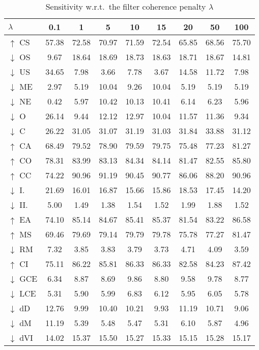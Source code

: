\documentclass[journal]{IEEEtran}
\begin{document}
\begin{table*}
    \caption{Sensitivity w.r.t.\ the filter coherence penalty $\lambda$}
	\centering
	\begin{tabular}{@{} l *{8}{S[table-format=2.3,detect-inline-weight=math,table-align-text-post=false]} @{}}
		\toprule
		{$\lambda$}      & {0.1} & {1} & {5} & {10} & {15} & {20} & {50} & {100} \\
		\midrule
		$\uparrow$ CS    & 57.38 & 72.58 & 70.97 & 71.59 & 72.54 & 65.85 & 68.56 & 75.70 \\
		$\downarrow$ OS  & 9.67 & 18.64 & 18.69 & 18.73 & 18.63 & 18.71 & 18.67 & 14.81 \\
		$\downarrow$ US  & 34.65 & 7.98 & 3.66 & 7.78 & 3.67 & 14.58 & 11.72 & 7.98 \\
		$\downarrow$ ME  & 2.97 & 5.19 & 10.04 & 9.26 & 10.04 & 5.19 & 5.19 & 5.19 \\
		$\downarrow$ NE  & 0.42 & 5.97 & 10.42 & 10.13 & 10.41 & 6.14 & 6.23 & 5.96 \\
		$\downarrow$ O   & 26.14 & 9.44 & 12.12 & 12.97 & 10.04 & 11.57 & 11.36 & 9.34 \\
		$\downarrow$ C   & 26.22 & 31.05 & 31.07 & 31.19 & 31.03 & 31.84 & 33.88 & 31.12 \\
		$\uparrow$ CA    & 68.49 & 79.52 & 78.90 & 79.59 & 79.75 & 75.48 & 77.23 & 81.27 \\
		$\uparrow$ CO    & 78.31 & 83.99 & 83.13 & 84.34 & 84.14 & 81.47 & 82.55 & 85.80 \\
		$\uparrow$ CC    & 74.22 & 90.96 & 91.19 & 90.45 & 90.77 & 86.06 & 88.20 & 90.96 \\
		$\downarrow$ I.  & 21.69 & 16.01 & 16.87 & 15.66 & 15.86 & 18.53 & 17.45 & 14.20 \\
		$\downarrow$ II. & 5.00 & 1.49 & 1.38 & 1.54 & 1.52 & 1.99 & 1.88 & 1.52 \\
		$\uparrow$ EA    & 74.10 & 85.14 & 84.67 & 85.41 & 85.37 & 81.54 & 83.22 & 86.58 \\
		$\uparrow$ MS    & 69.46 & 79.69 & 79.14 & 79.79 & 79.78 & 75.78 & 77.27 & 81.47 \\
		$\downarrow$ RM  & 7.32 & 3.85 & 3.83 & 3.79 & 3.73 & 4.71 & 4.09 & 3.59 \\
		$\uparrow$ CI    & 75.11 & 86.22 & 85.81 & 86.33 & 86.33 & 82.58 & 84.23 & 87.42 \\
		$\downarrow$ GCE & 6.34 & 8.87 & 8.69 & 9.86 & 8.80 & 9.58 & 9.78 & 8.77 \\
		$\downarrow$ LCE & 5.31 & 5.90 & 5.99 & 6.83 & 6.12 & 5.95 & 6.05 & 5.78 \\
		$\downarrow$ dD  & 12.76 & 9.99 & 10.40 & 10.21 & 9.93 & 11.19 & 10.71 & 9.06 \\
		$\downarrow$ dM  & 11.19 & 5.39 & 5.48 & 5.47 & 5.31 & 6.10 & 5.87 & 4.96 \\
		$\downarrow$ dVI & 14.02 & 15.37 & 15.50 & 15.27 & 15.33 & 15.15 & 15.28 & 15.17 \\
		\bottomrule
	\end{tabular}
	
	\label{tbl:paramsense_filter_coherence}
\end{table*}
\end{document}
